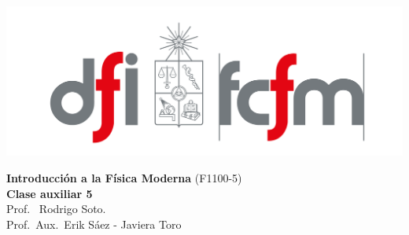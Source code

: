 \documentclass[
  11pt,
  letterpaper,
   addpoints,
  ]{exam}
\begin{document}
\pagestyle{headandfoot}

\noindent
\begin{minipage}{0.47\textwidth}
\includegraphics[width=\textwidth]{../fcfm_die.png}
\end{minipage}
\begin{minipage}{0.53\textwidth}
\begin{center} 
\large\textbf{Introducción a la Física Moderna} (F1100-5) \\
\large\textbf{Clase auxiliar 5} \\
\normalsize Prof.~ Rodrigo Soto.\\
\normalsize Prof.~Aux.~Erik Sáez - Javiera Toro 
\end{center}
\end{minipage}

\vspace{0.5cm}
\noindent
\vspace{.85cm}
\end{document}
